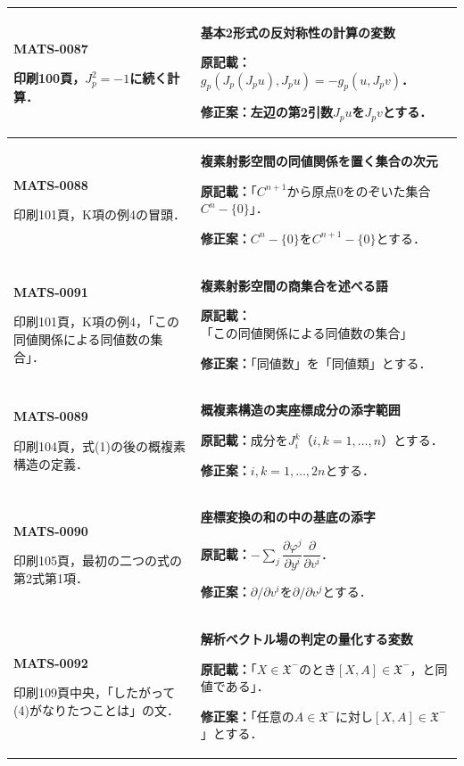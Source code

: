 \documentclass[a4paper,10pt]{ltjsarticle}
\begin{document}
\begin{longtable}{@{}>{\raggedright\arraybackslash}p{.19\linewidth}>{\raggedright\arraybackslash}p{.77\linewidth}@{}}
\hline
\hypertarget{MATS-0087}{}\textbf{MATS-0087}\par 印刷100頁，$J_p^2=-1$に続く計算． & \textbf{基本2形式の反対称性の計算の変数}\par\textbf{原記載：}$g_p(J_p(J_pu),J_pu)=-g_p(u,J_pv)$．\par\textbf{修正案：}左辺の第2引数$J_pu$を$J_pv$とする． \\[3pt]
\hline
\hypertarget{MATS-0088}{}\textbf{MATS-0088}\par 印刷101頁，K項の例4の冒頭． & \textbf{複素射影空間の同値関係を置く集合の次元}\par\textbf{原記載：}「$C^{n+1}$から原点0をのぞいた集合$C^n-\{0\}$」．\par\textbf{修正案：}$C^n-\{0\}$を$C^{n+1}-\{0\}$とする． \\[3pt]
\hline
\hypertarget{MATS-0091}{}\textbf{MATS-0091}\par 印刷101頁，K項の例4，「この同値関係による同値数の集合」． & \textbf{複素射影空間の商集合を述べる語}\par\textbf{原記載：}「この同値関係による同値数の集合」\par\textbf{修正案：}「同値数」を「同値類」とする． \\[3pt]
\hline
\hypertarget{MATS-0089}{}\textbf{MATS-0089}\par 印刷104頁，式(1)の後の概複素構造の定義． & \textbf{概複素構造の実座標成分の添字範囲}\par\textbf{原記載：}成分を$J_i^k$（$i,k=1,\ldots,n$）とする．\par\textbf{修正案：}$i,k=1,\ldots,2n$とする． \\[3pt]
\hline
\hypertarget{MATS-0090}{}\textbf{MATS-0090}\par 印刷105頁，最初の二つの式の第2式第1項． & \textbf{座標変換の和の中の基底の添字}\par\textbf{原記載：}$-\sum_j\dfrac{\partial\varphi^j}{\partial y^i}\dfrac\partial{\partial v^i}$．\par\textbf{修正案：}$\partial/\partial v^i$を$\partial/\partial v^j$とする． \\[3pt]
\hline
\hypertarget{MATS-0092}{}\textbf{MATS-0092}\par 印刷109頁中央，「したがって(4)がなりたつことは」の文． & \textbf{解析ベクトル場の判定の量化する変数}\par\textbf{原記載：}「$X\in\mathfrak X^-$のとき$[X,A]\in\mathfrak X^-$，と同値である」．\par\textbf{修正案：}「任意の$A\in\mathfrak X^-$に対し$[X,A]\in\mathfrak X^-$」とする． \\[3pt]

\end{longtable}
\end{document}
